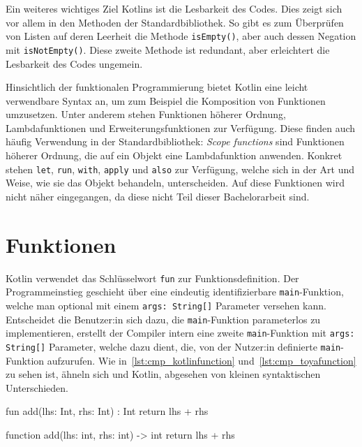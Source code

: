 Ein weiteres wichtiges Ziel Kotlins ist die Lesbarkeit des Codes. Dies zeigt sich vor allem in den Methoden der Standardbibliothek. So gibt es zum Überprüfen von Listen auf deren Leerheit die Methode \texttt{isEmpty()}, aber auch dessen Negation mit \texttt{isNotEmpty()}. Diese zweite Methode ist redundant, aber erleichtert die Lesbarkeit des Codes ungemein.

Hinsichtlich der funktionalen Programmierung bietet Kotlin eine leicht verwendbare Syntax an, um zum Beispiel die Komposition von Funktionen umzusetzen. Unter anderem stehen Funktionen höherer Ordnung, Lambdafunktionen und Erweiterungsfunktionen zur Verfügung. Diese finden auch häufig Verwendung in der Standardbibliothek: \textit{Scope functions} sind Funktionen höherer Ordnung, die auf ein Objekt eine Lambdafunktion anwenden. Konkret stehen \texttt{let}, \texttt{run}, \texttt{with}, \texttt{apply} und \texttt{also} zur Verfügung, welche sich in der Art und Weise, wie sie das Objekt behandeln, unterscheiden. Auf diese Funktionen wird nicht näher eingegangen, da diese nicht Teil dieser Bachelorarbeit sind.

\section{Funktionen}

Kotlin verwendet das Schlüsselwort \texttt{fun} zur Funktionsdefinition. Der Programmeinstieg geschieht über eine eindeutig identifizierbare \texttt{main}-Funktion, welche man optional mit einem \texttt{args: String[]} Parameter versehen kann. Entscheidet die Benutzer:in sich dazu, die \texttt{main}-Funktion parameterlos zu implementieren, erstellt der Compiler intern eine zweite \texttt{main}-Funktion mit \texttt{args: String[]} Parameter, welche dazu dient, die, von der Nutzer:in definierte \texttt{main}-Funktion aufzurufen. Wie in~\autoref{lst:cmp_kotlinfunction} und~\autoref{lst:cmp_toyafunction} zu sehen ist, ähneln sich \toya und Kotlin, abgesehen von kleinen syntaktischen Unterschieden.

\begin{KotlinCode}[numbers=none, caption={Funktion unter Kotlin}, label=lst:cmp_kotlinfunction]
fun add(lhs: Int, rhs: Int) : Int {
    return lhs + rhs
}
\end{KotlinCode}

\begin{ToyaCode}[numbers=none, caption={Funktion unter \toya}, label=lst:cmp_toyafunction]
function add(lhs: int, rhs: int) -> int {
    return lhs + rhs
}
\end{ToyaCode}

